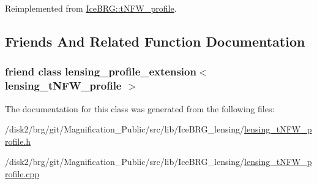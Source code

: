 Reimplemented from \hyperlink{classIceBRG_1_1tNFW__profile_a7b652f93aa159c0bdffa657f4bfa1c46}{Ice\-B\-R\-G\-::t\-N\-F\-W\-\_\-profile}.



\subsection{Friends And Related Function Documentation}
\hypertarget{classIceBRG_1_1lensing__tNFW__profile_a959d8115518ab64335bb4b660a91e4e3}{
\subsubsection[{lensing\-\_\-profile\-\_\-extension$<$ lensing\-\_\-t\-N\-F\-W\-\_\-profile $>$}]{\setlength{\rightskip}{0pt plus 5cm}friend class {\bf lensing\-\_\-profile\-\_\-extension}$<$ {\bf lensing\-\_\-t\-N\-F\-W\-\_\-profile} $>$\hspace{0.3cm}{\ttfamily [friend]}}}\label{classIceBRG_1_1lensing__tNFW__profile_a959d8115518ab64335bb4b660a91e4e3}


The documentation for this class was generated from the following files\-:\begin{DoxyCompactItemize}
\item 
/disk2/brg/git/\-Magnification\-\_\-\-Public/src/lib/\-Ice\-B\-R\-G\-\_\-lensing/\hyperlink{lensing__tNFW__profile_8h}{lensing\-\_\-t\-N\-F\-W\-\_\-profile.\-h}\item 
/disk2/brg/git/\-Magnification\-\_\-\-Public/src/lib/\-Ice\-B\-R\-G\-\_\-lensing/\hyperlink{lensing__tNFW__profile_8cpp}{lensing\-\_\-t\-N\-F\-W\-\_\-profile.\-cpp}\end{DoxyCompactItemize}
